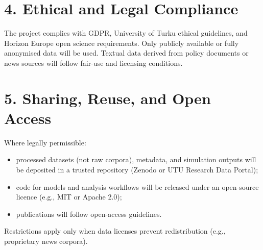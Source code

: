 \documentclass{nfr}
\begin{document}
\section*{4. Ethical and Legal Compliance}

The project complies with GDPR, University of Turku ethical guidelines, and Horizon Europe open science requirements.  
Only publicly available or fully anonymised data will be used.  
Textual data derived from policy documents or news sources will follow fair-use and licensing conditions.

\section*{5. Sharing, Reuse, and Open Access}

Where legally permissible:
\begin{itemize}
    \item processed datasets (not raw corpora), metadata, and simulation outputs will be deposited in a trusted repository (Zenodo or UTU Research Data Portal);
    \item code for models and analysis workflows will be released under an open-source licence (e.g., MIT or Apache 2.0);
    \item publications will follow open-access guidelines.
\end{itemize}
Restrictions apply only when data licenses prevent redistribution (e.g., proprietary news corpora).

\end{document}
